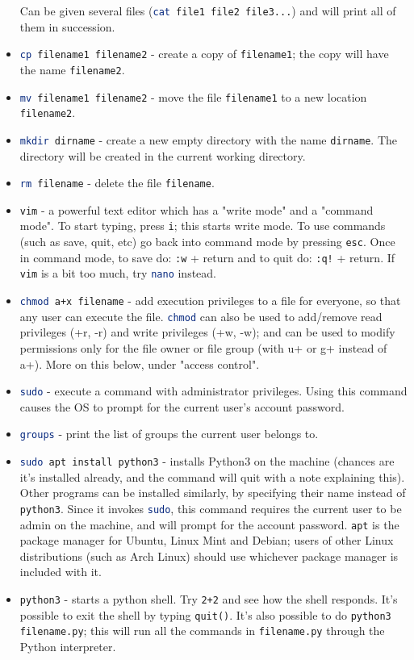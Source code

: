 \documentclass{article}
\newcommand{\xcode}[2]{\colorbox{ubuntuback}{\lstinline[language=#1]|#2|}}
\newcommand{\code}[1]{\colorbox{ubuntuback}{\texttt{#1}}}
\begin{document}
\begin{itemize}
        Can be given several files (\xcode{bash}{cat file1 file2 file3...}) and will print all of them in succession.    
    \item \xcode{bash}{cp filename1 filename2} - create a copy of \code{filename1}; the copy will have the name \code{filename2}.
    \item \xcode{bash}{mv filename1 filename2} - move the file \code{filename1} to a new location \code{filename2}.
    \item \xcode{bash}{mkdir dirname} - create a new empty directory with the name \code{dirname}. The directory will be created in the current working directory.
    \item \xcode{bash}{rm filename} - delete the file \code{filename}.
    \item \xcode{bash}{vim} - a powerful text editor which has a "write mode" and a "command mode". To start typing, press \xcode{bash}{i}; this starts write mode. To use commands (such as save, quit, etc) go back into command mode by pressing \code{esc}. Once in command mode, to save do: \xcode{bash}{:w} + return and to quit do: \xcode{bash}{:q!} + return. If \xcode{bash}{vim} is a bit too much, try \xcode{bash}{nano} instead.
    \item \xcode{bash}{chmod a+x filename} - add execution privileges to a file for everyone, so that any user can execute the file. \xcode{bash}{chmod} can also be used to add/remove read privileges (+r, -r) and write privileges (+w, -w); and can be used to modify permissions only for the file owner or file group (with u+ or g+ instead of a+). More on this below, under "access control". 
    \item \xcode{bash}{sudo} - execute a command with administrator privileges. Using this command causes the OS to prompt for the current user's account password.
    \item \xcode{bash}{groups} - print the list of groups the current user belongs to.
    \item \xcode{bash}{sudo apt install python3} - installs Python3 on the machine (chances are it's installed already, and the command will quit with a note explaining this). Other programs can be installed similarly, by specifying their name instead of \code{python3}. Since it invokes \xcode{bash}{sudo}, this command requires the current user to be admin on the machine, and will prompt for the account password. \code{apt} is the package manager for Ubuntu, Linux Mint and Debian; users of other Linux distributions (such as Arch Linux) should use whichever package manager is included with it.
    \item \xcode{bash}{python3} - starts a python shell. Try \code{2+2} and see how the shell responds. It's possible to exit the shell by typing \code{quit()}. It's also possible to do \xcode{bash}{python3 filename.py}; this will run all the commands in \code{filename.py} through the Python interpreter.
\end{itemize}
\end{document}
